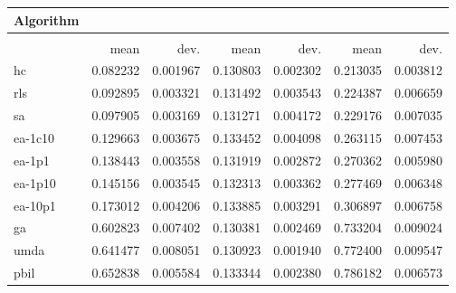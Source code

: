 \begin{tabular}{@{} l *{6}{>{{}}N{1}{2}} @{}}
\toprule
{Algorithm} &  \\
\midrule
&  &  &  \\
\midrule
& {mean} & {dev.} & {mean} & {dev.} & {mean} & {dev.} \\
\midrule
hc & 0.082232 & 0.001967 & 0.130803 & 0.002302 & 0.213035 & 0.003812 \\
rls & 0.092895 & 0.003321 & 0.131492 & 0.003543 & 0.224387 & 0.006659 \\
sa & 0.097905 & 0.003169 & 0.131271 & 0.004172 & 0.229176 & 0.007035 \\
ea-1c10 & 0.129663 & 0.003675 & 0.133452 & 0.004098 & 0.263115 & 0.007453 \\
ea-1p1 & 0.138443 & 0.003558 & 0.131919 & 0.002872 & 0.270362 & 0.005980 \\
ea-1p10 & 0.145156 & 0.003545 & 0.132313 & 0.003362 & 0.277469 & 0.006348 \\
ea-10p1 & 0.173012 & 0.004206 & 0.133885 & 0.003291 & 0.306897 & 0.006758 \\
ga & 0.602823 & 0.007402 & 0.130381 & 0.002469 & 0.733204 & 0.009024 \\
umda & 0.641477 & 0.008051 & 0.130923 & 0.001940 & 0.772400 & 0.009547 \\
pbil & 0.652838 & 0.005584 & 0.133344 & 0.002380 & 0.786182 & 0.006573 \\
\bottomrule
\end{tabular}
